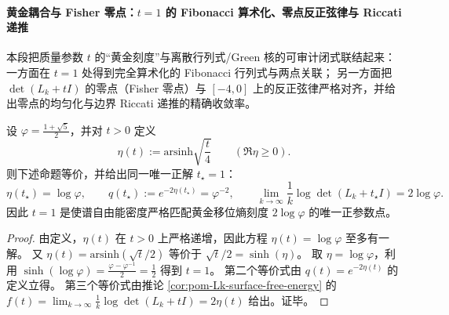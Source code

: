 \paragraph{黄金耦合与 Fisher 零点：\texorpdfstring{\(t=1\)}{t=1} 的 Fibonacci 算术化、零点反正弦律与 Riccati 递推}
本段把质量参数 \(t\) 的“黄金刻度”与离散行列式/Green 核的可审计闭式联结起来：
一方面在 \(t=1\) 处得到完全算术化的 Fibonacci 行列式与两点关联；
另一方面把 \(\det(L_k+tI)\) 的零点（Fisher 零点）与 \([-4,0]\) 上的反正弦律严格对齐，并给出零点的均匀化与边界 Riccati 递推的精确收敛率。

\begin{corollary}[“黄金耦合”唯一性：\texorpdfstring{\(t=1\)}{t=1} 的等价刻画]\label{cor:pom-Lk-golden-coupling-unique}
设 \(\varphi=\frac{1+\sqrt5}{2}\)，并对 \(t>0\) 定义
\[
\eta(t):=\mathrm{arsinh}\sqrt{\frac{t}{4}}\qquad(\Re\eta\ge 0).
\]
则下述命题等价，并给出同一唯一正解 \(t_\star=1\)：
\[
\eta(t_\star)=\log\varphi,
\qquad
q(t_\star):=e^{-2\eta(t_\star)}=\varphi^{-2},
\qquad
\lim_{k\to\infty}\frac{1}{k}\log\det(L_k+t_\star I)=2\log\varphi.
\]
因此 \(t=1\) 是使谱自由能密度严格匹配黄金移位熵刻度 \(2\log\varphi\) 的唯一正参数点。
\end{corollary}
\begin{proof}
由定义，\(\eta(t)\) 在 \(t>0\) 上严格递增，因此方程 \(\eta(t)=\log\varphi\) 至多有一解。
又
\(
\eta(t)=\mathrm{arsinh}(\sqrt{t}/2)
\)
等价于 \(\sqrt{t}/2=\sinh(\eta)\)。
取 \(\eta=\log\varphi\)，利用
\(
\sinh(\log\varphi)=\frac{\varphi-\varphi^{-1}}{2}=\frac12
\)
得到 \(t=1\)。
第二个等价式由 \(q(t)=e^{-2\eta(t)}\) 的定义立得。
第三个等价式由推论 \ref{cor:pom-Lk-surface-free-energy} 的 \(f(t)=\lim_{k\to\infty}\frac1k\log\det(L_k+tI)=2\eta(t)\) 给出。证毕。
\end{proof}

